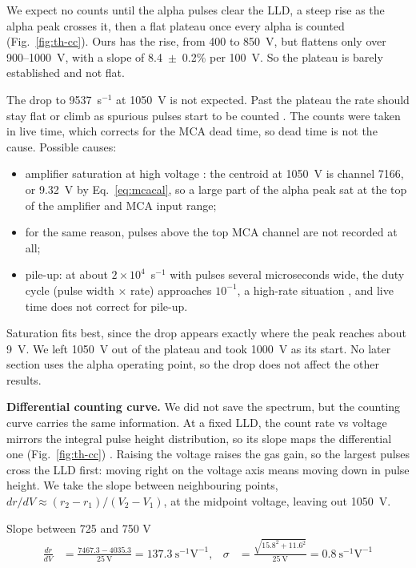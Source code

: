 \documentclass[12pt]{article}
\begin{document}
We expect no counts until the alpha pulses clear the LLD, a steep rise as the alpha peak crosses it, then a flat plateau once every alpha is counted (Fig.~\ref{fig:th-cc}). Ours has the rise, from 400 to 850~V, but flattens only over 900--1000~V, with a slope of 8.4~$\pm$~0.2\% per 100~V. So the plateau is barely established and not flat.

The drop to 9537~s$^{-1}$ at 1050~V is not expected. Past the plateau the rate should stay flat or climb as spurious pulses start to be counted \cite{knoll}. The counts were taken in live time, which corrects for the MCA dead time, so dead time is not the cause. Possible causes:
\begin{itemize}
\item amplifier saturation at high voltage \cite{labmanual}: the centroid at 1050~V is channel 7166, or 9.32~V by Eq.~\ref{eq:mcacal}, so a large part of the alpha peak sat at the top of the amplifier and MCA input range;
\item for the same reason, pulses above the top MCA channel are not recorded at all;
\item pile-up: at about $2\times10^4$~s$^{-1}$ with pulses several microseconds wide, the duty cycle (pulse width $\times$ rate) approaches $10^{-1}$, a high-rate situation \cite{knoll}, and live time does not correct for pile-up.
\end{itemize}
Saturation fits best, since the drop appears exactly where the peak reaches about 9~V. We left 1050~V out of the plateau and took 1000~V as its start. No later section uses the alpha operating point, so the drop does not affect the other results.

\textbf{Differential counting curve.} We did not save the spectrum, but the counting curve carries the same information. At a fixed LLD, the count rate vs voltage mirrors the integral pulse height distribution, so its slope maps the differential one (Fig.~\ref{fig:th-cc}) \cite{knoll}. Raising the voltage raises the gas gain, so the largest pulses cross the LLD first: moving right on the voltage axis means moving down in pulse height. We take the slope between neighbouring points, $dr/dV \approx (r_2 - r_1)/(V_2 - V_1)$, at the midpoint voltage, leaving out 1050~V.

\begin{samplecalc}{Slope between 725 and 750 V}
\begin{align*}
\frac{dr}{dV} &= \frac{7467.3 - 4035.3}{25\ \text{V}} = 137.3\ \text{s}^{-1}\text{V}^{-1}, &
\sigma &= \frac{\sqrt{15.8^2 + 11.6^2}}{25\ \text{V}} = 0.8\ \text{s}^{-1}\text{V}^{-1}
\end{align*}
\end{samplecalc}
\end{document}
